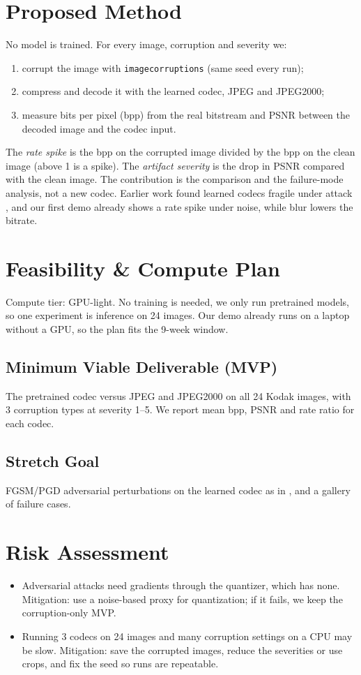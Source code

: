 \documentclass[11pt]{article}
\begin{document}
\section{Proposed Method}
\label{sec:method}
No model is trained. For every image, corruption and severity we:
\begin{enumerate}[leftmargin=*]
  \item corrupt the image with \texttt{imagecorruptions} (same seed every run);
  \item compress and decode it with the learned codec, JPEG and JPEG2000;
  \item measure bits per pixel (bpp) from the real bitstream and PSNR between the decoded image and the codec input.
\end{enumerate}
The \emph{rate spike} is the bpp on the corrupted image divided by the bpp on the clean image (above 1 is a spike). The \emph{artifact severity} is the drop in PSNR compared with the clean image. The contribution is the comparison and the failure-mode analysis, not a new codec. Earlier work found learned codecs fragile under attack \citep{zhu2024attack,wu2024adversarial}, and our first demo already shows a rate spike under noise, while blur lowers the bitrate.

\section{Feasibility \& Compute Plan}
\label{sec:feasibility}
Compute tier: GPU-light. No training is needed, we only run pretrained models, so one experiment is inference on 24 images. Our demo already runs on a laptop without a GPU, so the plan fits the 9-week window.

\subsection{Minimum Viable Deliverable (MVP)}
The pretrained codec versus JPEG and JPEG2000 on all 24 Kodak images, with 3 corruption types at severity 1--5. We report mean bpp, PSNR and rate ratio for each codec.

\subsection{Stretch Goal}
FGSM/PGD adversarial perturbations on the learned codec as in \citet{zhu2024attack}, and a gallery of failure cases.

\section{Risk Assessment}
\label{sec:risk}
\begin{itemize}[leftmargin=*]
  \item Adversarial attacks need gradients through the quantizer, which has none. Mitigation: use a noise-based proxy for quantization; if it fails, we keep the corruption-only MVP.
  \item Running 3 codecs on 24 images and many corruption settings on a CPU may be slow. Mitigation: save the corrupted images, reduce the severities or use crops, and fix the seed so runs are repeatable.
\end{itemize}
\end{document}
